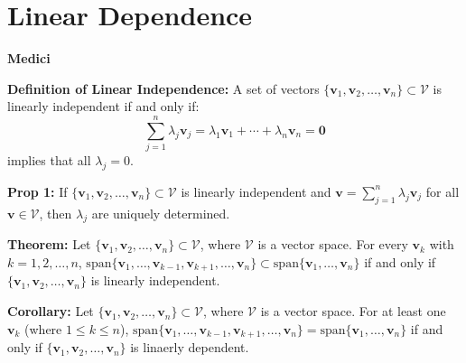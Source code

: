 \documentclass{article}
\newcommand{\spann}[1]{\mathrm{span}\{#1\}}
\begin{document}
    \section{Linear Dependence}
    \begin{minipage}[t]{.45\textwidth} %
        \begin{center}
            \textbf{Medici}
        \end{center}
        \textbf{Definition of Linear Independence:} A set of vectors $\{\bm{v}_1,\bm{v}_2,\dots,\bm{v}_n\} \subset \mathcal{V}$ is linearly independent if and only if:
        \begin{equation*}
            \sum_{j=1}^n \lambda_j \bm{v}_j = \lambda_1\bm{v}_1 +\cdots + \lambda_n\bm{v}_n = \bm{0}
        \end{equation*}
        implies that all $\lambda_j=0$.
        \vspace{2mm}
        
        \textbf{Prop 1:} If $\{\bm{v}_1,\bm{v}_2,\dots,\bm{v}_n\} \subset \mathcal{V}$ is linearly independent and $\bm{v} = \sum_{j=1}^n \lambda_j \bm{v}_j$ for all $\bm{v} \in \mathcal{V}$, then $\lambda_j$ are uniquely determined.
        \vspace{2mm}

        \textbf{Theorem:} Let $\{\bm{v}_1,\bm{v}_2,\dots,\bm{v}_n\} \subset \mathcal{V}$, where $\mathcal{V}$ is a vector space. For every $\bm{v}_k$ with $k=1,2,\dots,n$, $\spann{\bm{v}_1,\dots,\bm{v}_{k-1},\bm{v}_{k+1},\dots,\bm{v}_n} \subset \spann{\bm{v}_1,\dots,\bm{v}_n}$ if and only if $\{\bm{v}_1,\bm{v}_2,\dots,\bm{v}_n\}$ is linearly independent.
        \vspace{2mm}

        \textbf{Corollary:} Let $\{\bm{v}_1,\bm{v}_2,\dots,\bm{v}_n\} \subset \mathcal{V}$, where $\mathcal{V}$ is a vector space. For at least one $\bm{v}_k$ (where $1 \le k \le n$), $\spann{\bm{v}_1,\dots,\bm{v}_{k-1},\bm{v}_{k+1},\dots,\bm{v}_n} = \spann{\bm{v}_1,\dots,\bm{v}_n}$ if and only if $\{\bm{v}_1,\bm{v}_2,\dots,\bm{v}_n\}$ is linaerly dependent.
    \end{minipage}
    \hfill
\end{document}
